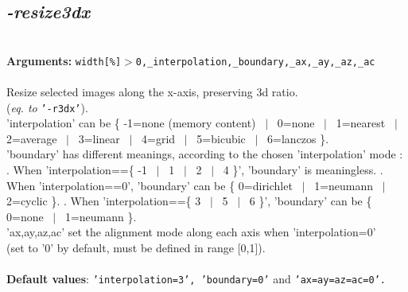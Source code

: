 \documentclass[a4paper,11pt,twoside]{book}
\begin{document}
\subsection{\emph{-resize3dx} }\vspace*{-0.5em}
~\\\textbf{Arguments: } 
{\small \texttt{width[\%]$>$0,\_interpolation,\_boundary,\_ax,\_ay,\_az,\_ac}}\\~\\
Resize selected images along the x-axis, preserving 3d ratio.
~\\(\emph{eq. to} {\small \texttt{'-r3dx'}}).
~\\'interpolation' can be \{ -1=none (memory content) ~$|$~ 0=none ~$|$~ 1=nearest ~$|$~ 2=average ~$|$~ 3=linear ~$|$~ 4=grid ~$|$~ 5=bicubic ~$|$~ 6=lanczos \}.
~\\'boundary' has different meanings, according to the chosen 'interpolation' mode :
. When 'interpolation==\{ -1 ~$|$~ 1 ~$|$~ 2 ~$|$~ 4 \}', 'boundary' is meaningless.
. When 'interpolation==0', 'boundary' can be \{ 0=dirichlet ~$|$~ 1=neumann ~$|$~ 2=cyclic \}.
. When 'interpolation==\{ 3 ~$|$~ 5 ~$|$~ 6 \}', 'boundary' can be \{ 0=none ~$|$~ 1=neumann \}.
~\\'ax,ay,az,ac' set the alignment mode along each axis when 'interpolation=0'
~\\(set to '0' by default, must be defined in range [0,1]).
~\\~\\\textbf{Default values}: {\small \texttt{'interpolation=3', 'boundary=0'} and \texttt{'ax=ay=az=ac=0'.}}
\end{document}
